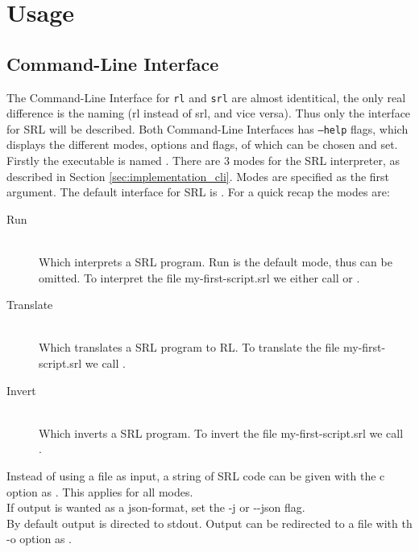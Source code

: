 \section{Usage}

\subsection{Command-Line Interface}

The Command-Line Interface for \texttt{rl} and \texttt{srl} are almost identitical, the only real difference is the naming (rl instead of srl, and vice versa).
Thus only the interface for SRL will be described.
Both Command-Line Interfaces has \texttt{--help} flags, which displays the different modes, options and flags, of which can be chosen and set.\\

\noindent
Firstly the executable is named .
There are 3 modes for the SRL interpreter, as described in Section \ref{sec:implementation_cli}.
Modes are specified as the first argument. The default interface for SRL is .
For a quick recap the modes are:\\

\begin{description}

  \item[Run]~\\
    Which interprets a SRL program. Run is the default mode, thus can be omitted.
    To interpret the file my-first-script.srl we either call  or .\\

  \item[Translate]~\\
    Which translates a SRL program to RL.
    To translate the file my-first-script.srl we call .\\

  \item[Invert]~\\
    Which inverts a SRL program.
    To invert the file my-first-script.srl we call\\ .\\

\end{description}

Instead of using a file as input, a string of SRL code can be given with the c option as . This applies for all modes.\\
If output is wanted as a json-format, set the -j or {-}{-}json flag.\\
By default output is directed to stdout. Output can be redirected to a file with th -o option as .\\

